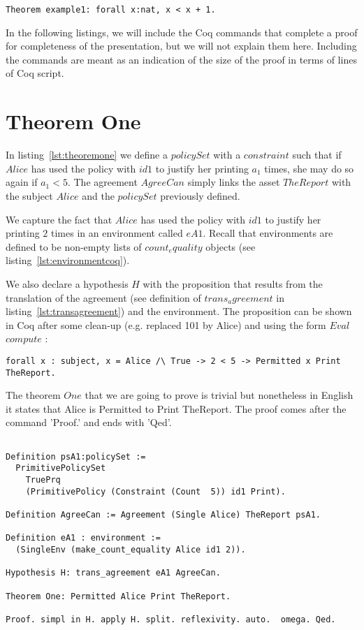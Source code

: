 \lstset{language=Coq}
\begin{lstlisting}[frame=single, caption={Proof Example},label={lst:proofexample}]
Theorem example1: forall x:nat, x < x + 1.
\end{lstlisting}

In the following listings, we will include the Coq commands that complete a proof for completeness of the presentation, but we will not explain them here. Including the commands are meant as an indication of the size of the proof in terms of lines of Coq script.


\section{Theorem One}

In listing~\ref{lst:theoremone} we define a $policySet$ with a $constraint$ such that if $Alice$ has used the policy with $id1$ to justify her printing $a_{1}$ times, she may do so again if $a_{1} < 5$. The agreement $AgreeCan$ simply links the asset $TheReport$ with the subject $Alice$ and the $policySet$ previously defined. 

We capture the fact that $Alice$ has used the policy with $id1$ to justify her printing $2$ times in an environment called $eA1$. Recall that environments are defined to be non-empty lists of $count_equality$ objects (see listing~\ref{lst:environmentcoq}). 

We also declare a hypothesis $H$ with the proposition that results from the translation of the agreement (see definition of $trans_agreement$ in listing~\ref{lst:transagreement}) and the environment. The proposition can be shown in Coq after some clean-up (e.g. replaced 101 by Alice) and using the form $Eval$ $compute$ : 

\lstset{language=Coq}
\begin{lstlisting}[frame=single, caption={Hypothesis for Theorem One},label={lst:theoremonehypo}]
forall x : subject, x = Alice /\ True -> 2 < 5 -> Permitted x Print TheReport.
\end{lstlisting}

The theorem $One$ that we are going to prove is trivial but nonetheless in English it states that Alice is Permitted to Print TheReport. The proof comes after the command 'Proof.' and ends with 'Qed'. 

\lstset{language=Coq}
\begin{lstlisting}[frame=single, caption={Theorem One},label={lst:theoremone}]

Definition psA1:policySet :=
  PrimitivePolicySet
    TruePrq
    (PrimitivePolicy (Constraint (Count  5)) id1 Print).

Definition AgreeCan := Agreement (Single Alice) TheReport psA1.

Definition eA1 : environment := 
  (SingleEnv (make_count_equality Alice id1 2)).

Hypothesis H: trans_agreement eA1 AgreeCan.

Theorem One: Permitted Alice Print TheReport.

Proof. simpl in H. apply H. split. reflexivity. auto.  omega. Qed.


\end{lstlisting}

